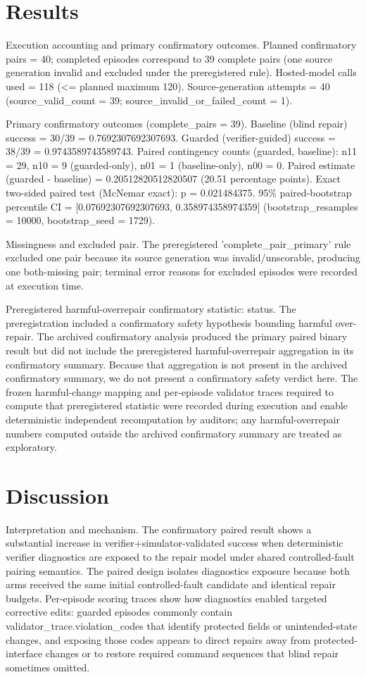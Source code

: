 \documentclass[conference]{IEEEtran}
\begin{document}
\section{Results}
Execution accounting and primary confirmatory outcomes. Planned confirmatory pairs = 40; completed episodes correspond to 39 complete pairs (one source generation invalid and excluded under the preregistered rule). Hosted-model calls used = 118 (<= planned maximum 120). Source-generation attempts = 40 (source\_valid\_count = 39; source\_invalid\_or\_failed\_count = 1).

Primary confirmatory outcomes (complete\_pairs = 39). Baseline (blind repair) success = 30/39 = 0.7692307692307693. Guarded (verifier-guided) success = 38/39 = 0.9743589743589743. Paired contingency counts (guarded, baseline): n11 = 29, n10 = 9 (guarded-only), n01 = 1 (baseline-only), n00 = 0. Paired estimate (guarded - baseline) = 0.20512820512820507 (20.51 percentage points). Exact two-sided paired test (McNemar exact): p = 0.021484375. 95\% paired-bootstrap percentile CI = [0.07692307692307693, 0.358974358974359] (bootstrap\_resamples = 10000, bootstrap\_seed = 1729).

Missingness and excluded pair. The preregistered 'complete\_pair\_primary' rule excluded one pair because its source generation was invalid/unscorable, producing one both-missing pair; terminal error reasons for excluded episodes were recorded at execution time.

Preregistered harmful-overrepair confirmatory statistic: status. The preregistration included a confirmatory safety hypothesis bounding harmful over-repair. The archived confirmatory analysis produced the primary paired binary result but did not include the preregistered harmful-overrepair aggregation in its confirmatory summary. Because that aggregation is not present in the archived confirmatory summary, we do not present a confirmatory safety verdict here. The frozen harmful-change mapping and per-episode validator traces required to compute that preregistered statistic were recorded during execution and enable deterministic independent recomputation by auditors; any harmful-overrepair numbers computed outside the archived confirmatory summary are treated as exploratory.

\section{Discussion}
Interpretation and mechanism. The confirmatory paired result shows a substantial increase in verifier+simulator-validated success when deterministic verifier diagnostics are exposed to the repair model under shared controlled-fault pairing semantics. The paired design isolates diagnostics exposure because both arms received the same initial controlled-fault candidate and identical repair budgets. Per-episode scoring traces show how diagnostics enabled targeted corrective edits: guarded episodes commonly contain validator\_trace.violation\_codes that identify protected fields or unintended-state changes, and exposing those codes appears to direct repairs away from protected-interface changes or to restore required command sequences that blind repair sometimes omitted.
\end{document}
